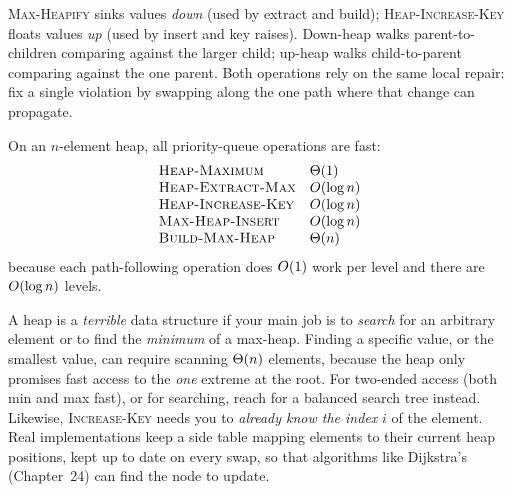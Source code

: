 \begin{intuitionbox}
\textsc{Max-Heapify} sinks values \emph{down} (used by extract and build);
\textsc{Heap-Increase-Key} floats values \emph{up} (used by insert and key
raises). Down-heap walks parent-to-children comparing against the larger child;
up-heap walks child-to-parent comparing against the one parent. Both operations
rely on the same local repair: fix a single violation by swapping along the one
path where that change can propagate.
\end{intuitionbox}

\begin{complexitybox}
On an $n$-element heap, all priority-queue operations are fast:
\[
\begin{array}{ll}
\textsc{Heap-Maximum} & \Theta(1) \\
\textsc{Heap-Extract-Max} & O(\log n) \\
\textsc{Heap-Increase-Key} & O(\log n) \\
\textsc{Max-Heap-Insert} & O(\log n) \\
\textsc{Build-Max-Heap} & \Theta(n) \\
\end{array}
\]
because each path-following operation does $O(1)$ work per level and there are
$O(\log n)$ levels.
\end{complexitybox}

\begin{trapbox}
A heap is a \emph{terrible} data structure if your main job is to \emph{search}
for an arbitrary element or to find the \emph{minimum} of a max-heap. Finding a
specific value, or the smallest value, can require scanning $\Theta(n)$ elements,
because the heap only promises fast access to the \emph{one} extreme at the root.
For two-ended access (both min and max fast), or for searching, reach for a
balanced search tree instead. Likewise, \textsc{Increase-Key} needs you to
\emph{already know the index} $i$ of the element. Real implementations keep a
side table mapping elements to their current heap positions, kept up to date on
every swap, so that algorithms like Dijkstra's (Chapter~24) can find the node to update.
\end{trapbox}


